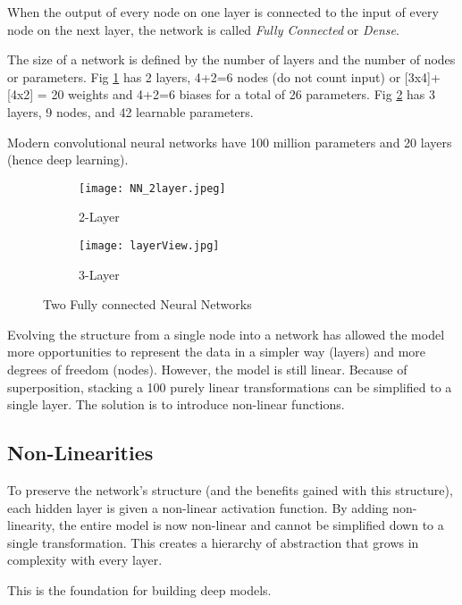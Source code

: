 When the output of every node on one layer is connected to the input of every node on the next layer, the network is called \emph{Fully Connected} or \emph{Dense}.  

The size of a network is defined by the number of layers and the number of nodes or parameters.  Fig \ref{fig:NN2} has 2 layers, 4+2=6 nodes (do not count input) or [3x4]+[4x2] = 20 weights and 4+2=6 biases for a total of 26  parameters.  Fig \ref{fig:NN3} has 3 layers, 9 nodes, and 42 learnable parameters.  

Modern convolutional neural networks have 100 million parameters and 20 layers (hence deep learning).  

\begin{figure}[!h]
\centering
\begin{subfigure}{.4\linewidth}
  \texttt{[image: NN\_2layer.jpeg]}
  \caption{2-Layer}
  \label{fig:NN2}
\end{subfigure}%
\hfill
\begin{subfigure}{.6\linewidth}
  \texttt{[image: layerView.jpg]}
  \caption{3-Layer}
  \label{fig:NN3}
\end{subfigure}
\caption{Two Fully connected Neural Networks\cite{Stanf}}
\label{fig:test}
\end{figure}

Evolving the structure from a single node into a network has allowed the model more opportunities to represent the data in a simpler way (layers) and more degrees of freedom (nodes).  However, the model is still linear. Because of superposition, stacking a 100 purely linear transformations can be simplified to a single layer. The solution is to introduce non-linear functions.

\subsection{Non-Linearities}
To preserve the network's structure (and the benefits gained with this structure), each hidden layer is given a non-linear activation function.  By adding non-linearity, the entire model is now non-linear and cannot be simplified down to a single transformation.  This creates a hierarchy of abstraction that grows in complexity with every layer.\cite{NvidiaConcepts} \cite{DataWknd}    


This is the foundation for building deep models.    


